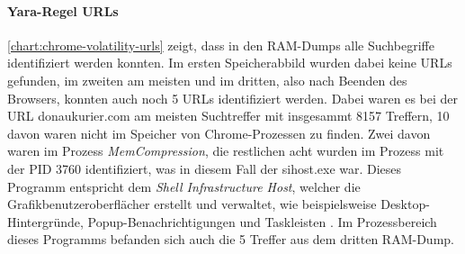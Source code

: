 \paragraph*{Yara-Regel \glqq{}URLs\grqq{}}\label{chap:ergebnisse-chrome-uncommon-volatility-urls}

\autoref{chart:chrome-volatility-urls} zeigt, dass in den RAM-Dumps alle Suchbegriffe identifiziert werden konnten. Im ersten Speicherabbild wurden dabei keine URLs gefunden, im zweiten am meisten und im dritten, also nach Beenden des Browsers, konnten auch noch 5 URLs identifiziert werden. Dabei waren es bei der URL \glqq{}donaukurier.com\grqq{} am meisten Suchtreffer mit insgesammt 8157 Treffern, 10 davon waren nicht im Speicher von Chrome-Prozessen zu finden. Zwei davon waren im Prozess \textit{MemCompression}, die restlichen acht wurden im Prozess mit der PID 3760 identifiziert, was in diesem Fall der sihost.exe war. Dieses Programm entspricht dem \textit{Shell Infrastructure Host}, welcher die Grafikbenutzeroberflächer erstellt und verwaltet, wie beispielsweise Desktop-Hintergründe, Popup-Benachrichtigungen und Taskleisten \cite{SiHostWebsite}. Im Prozessbereich dieses Programms befanden sich auch die 5 Treffer aus dem dritten RAM-Dump.

